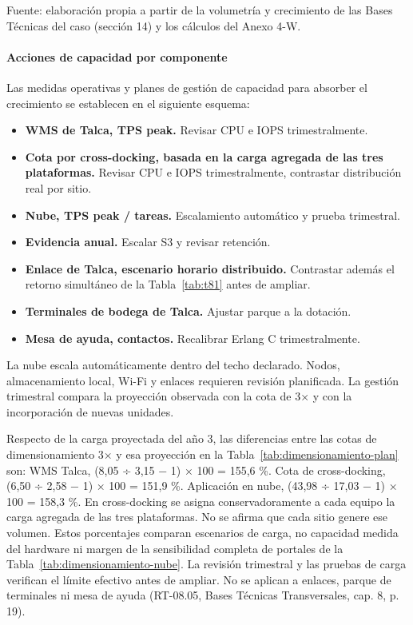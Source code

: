 {\fontsize{9pt}{11pt}\selectfont\raggedright Fuente: elaboración propia a partir de la volumetría y crecimiento de las Bases Técnicas del caso (sección 14) y los cálculos del Anexo 4-W.\par}

\paragraph*{Acciones de capacidad por componente}
Las medidas operativas y planes de gestión de capacidad para absorber el crecimiento se establecen en el siguiente esquema:
\begin{itemize}
\item \textbf{WMS de Talca, TPS peak.} Revisar CPU e IOPS trimestralmente.
\item \textbf{Cota por cross-docking, basada en la carga agregada de las tres plataformas.} Revisar CPU e IOPS trimestralmente, contrastar distribución real por sitio.
\item \textbf{Nube, TPS peak / tareas.} Escalamiento automático y prueba trimestral.
\item \textbf{Evidencia anual.} Escalar S3 y revisar retención.
\item \textbf{Enlace de Talca, escenario horario distribuido.} Contrastar además el retorno simultáneo de la Tabla~\ref{tab:t81} antes de ampliar.
\item \textbf{Terminales de bodega de Talca.} Ajustar parque a la dotación.
\item \textbf{Mesa de ayuda, contactos.} Recalibrar Erlang C trimestralmente.
\end{itemize}


La nube escala automáticamente dentro del techo declarado. Nodos, almacenamiento local, Wi-Fi y enlaces requieren revisión planificada. La gestión trimestral compara la proyección observada con la cota de 3× y con la incorporación de nuevas unidades.

Respecto de la carga proyectada del año 3, las diferencias entre las cotas de dimensionamiento 3× y esa proyección en la Tabla~\ref{tab:dimensionamiento-plan} son: WMS Talca, (8,05 ÷ 3,15 − 1) × 100 = 155,6 \%. Cota de cross-docking, (6,50 ÷ 2,58 − 1) × 100 = 151,9 \%. Aplicación en nube, (43,98 ÷ 17,03 − 1) × 100 = 158,3 \%. En cross-docking se asigna conservadoramente a cada equipo la carga agregada de las tres plataformas. No se afirma que cada sitio genere ese volumen. Estos porcentajes comparan escenarios de carga, no capacidad medida del hardware ni margen de la sensibilidad completa de portales de la Tabla~\ref{tab:dimensionamiento-nube}. La revisión trimestral y las pruebas de carga verifican el límite efectivo antes de ampliar. No se aplican a enlaces, parque de terminales ni mesa de ayuda (RT-08.05, Bases Técnicas Transversales, cap. 8, p. 19).


